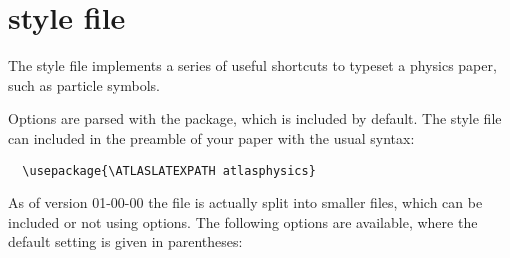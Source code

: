 \section{ style file}
\label{sec:atlasphysics}

The  style file implements a series of useful
shortcuts to typeset a physics paper, such as particle
symbols.

Options are parsed with the  package, which is included by default.
The style file can included in the preamble of your paper with the usual
syntax:
%
\begin{verbatim}
  \usepackage{\ATLASLATEXPATH atlasphysics}
\end{verbatim}
%
As of version 01-00-00 the file is actually split into smaller files,
which can be included or not using options.
The following options are available, where the default setting is given in parentheses:
